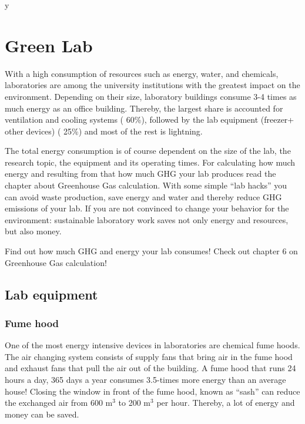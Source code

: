 y %

\chapter{Green Lab}\label{chap:lab}

With a high consumption of resources such as energy, water, and chemicals, laboratories are among the university institutions with the greatest impact on the environment. Depending on their size, laboratory buildings consume 3-4 times as much energy as an office building. Thereby, the largest share is accounted for ventilation and cooling systems (\raisebox{-0.9ex}{\~{ }} 60\%), followed by the lab equipment (freezer+ other devices) (\raisebox{-0.9ex}{\~{ }} 25\%) and most of the rest is lightning. \cite{GreenHarvard}

The total energy consumption is of course dependent on the size of the lab, the research topic, the equipment and its operating times. For calculating how much energy and resulting from that how much GHG your lab produces read the chapter about Greenhouse Gas calculation. %
With some simple “lab hacks” you can avoid waste production, save energy and water and thereby reduce GHG emissions of your lab. 
If you are not convinced to change your behavior for the environment: sustainable laboratory work saves not only energy and resources, but also money.

\begin{suggest}{Find out how much GHG and energy your lab consumes!}
	Check out chapter 6 on Greenhouse Gas calculation! %
\end{suggest}

\section{Lab equipment}

\subsection{Fume hood}
One of the most energy intensive devices in laboratories are chemical fume hoods. The air changing system consists of supply fans that bring air in the fume hood and exhaust fans that pull the air out of the building.  A fume hood that runs 24 hours a day, 365 days a year consumes 3.5-times more energy than an average house! Closing the window in front of the fume hood, known as “sash” can reduce the exchanged air from 600 m$^{3}$ to 200 m$^{3}$ per hour. Thereby, a lot of energy and money can be saved.

